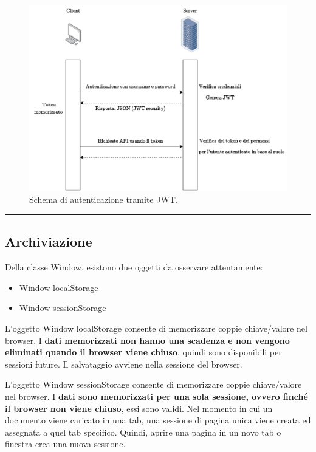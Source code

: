 \documentclass[a4paper]{article}
\newcommand{\longline}{\noindent\rule{\textwidth}{0.4pt}}
\begin{document}
	\begin{figure}[!htp]
		\centering
		\includegraphics[width=\textwidth]{img/we-plant/jwt.pdf}
		\caption{Schema di autenticazione tramite JWT.}
	\end{figure}
	
	\longline
	
	\subsection{Archiviazione}
	
	Della classe \textsf{Window}, esistono due oggetti da osservare attentamente:
	\begin{itemize}
		\item \textsf{Window localStorage}
		
		\item \textsf{Window sessionStorage}
	\end{itemize}
	L'oggetto \textsf{Window localStorage} consente di memorizzare coppie chiave/valore nel browser. I \textbf{dati memorizzati non hanno una scadenza e non vengono eliminati quando il browser viene chiuso}, quindi sono disponibili per sessioni future. Il salvataggio avviene nella sessione del browser.\newline
	
	\noindent
	L'oggetto \textsf{Window sessionStorage} consente di memorizzare coppie chiave/valore nel browser. I \textbf{dati sono memorizzati per una sola sessione, ovvero finché il browser non viene chiuso}, essi sono validi. Nel momento in cui un documento viene caricato in una tab, una sessione di pagina unica viene creata ed assegnata a quel tab specifico. Quindi, aprire una pagina in un novo tab o finestra crea una nuova sessione.\newpage
	
\end{document}
